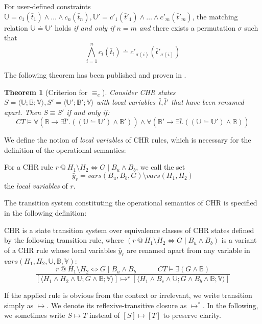 \documentclass[acmtocl]{acmtrans2m}
\newtheorem{theorem}{Theorem}[section]
\newcommand{\de}{\dot=}
\newcommand\state[1]{\langle #1 \rangle}
\newcommand{\B}{\ensuremath{\mathbb{B}}}
\newcommand{\U}{\ensuremath{\mathbb{U}}}
\newcommand{\V}{\ensuremath{\mathbb{V}}}
\newcommand{\bt}{\bar{t}}
\renewcommand{\bt}{\bar{t}}
\newcommand{\by}{\bar{y}}
\newcommand{\bl}{\bar{l}}
\newcommand{\oesq}{\ensuremath{\omega_{e}}}
\begin{document}
\begin{definition}
For user-defined constraints $\U=c_1(\bt_1)\wedge \ldots \wedge c_n(\bt_n),
\U'=c'_1(\bt'_1)\wedge \ldots \wedge c'_m(\bt'_m)$, the matching
relation $\U\doteq\U'$ holds \emph{if and only if} $n=m$ \emph{and} there exists a permutation $\sigma$
such that
\[
\bigwedge_{i=1}^n c_i(\bt_i) \doteq c'_{\sigma(i)}(\bt'_{\sigma(i)})
\]
\end{definition}

The following theorem has been published and proven in
\cite{Raiser2009a}.

\begin{theorem}[Criterion for $\equiv_e$]\label{thm:sq_crit}
\label{thm:criterion}
Consider CHR states $S = \state{\U;\B;\V}, S' = \state{\U';\B';\V}$ with local variables~$\bl,\bl'$ that have been renamed apart. Then $S\equiv S'$
\emph{if and only if}:
\[
CT\models \forall (\B \rightarrow \exists \bl'.((\U \de \U') \wedge
\B')) \wedge \forall (\B' \rightarrow \exists \bl.((\U \de \U') \land \B))
\]
\end{theorem}

We define the notion of \emph{local variables} of CHR rules, which is necessary
for the definition of the operational semantics:

\begin{definition}
For a CHR rule $r\ @\ H_1\setminus H_2\Leftrightarrow G \mid B_u\wedge B_b$, we
call the set
\[
\by_r = vars(B_u, B_b, G)\setminus vars(H_1, H_2)
\]
the \emph{local variables} of $r$.
\end{definition}


The transition system constituting the operational semantics of CHR is specified in the following
definition:

\begin{definition}[Transition System of $\oesq$]
\label{def:chr-op-sem}

CHR is a state transition system over equivalence classes of CHR states defined
by the following transition rule, where $(r\ @\ H_1 \setminus H_2 \Leftrightarrow
G\mid B_u \wedge B_b)$ is a variant of a CHR rule whose local variables $\by_r$
are renamed apart from any variable in $vars(H_1,H_2,\U,\B,\V)$:
\medskip
\[
\frac{
r\ @\ H_1 \setminus H_2 \Leftrightarrow G\mid B_u \wedge B_b
\quad\quad\quad
CT\models \exists(G\wedge\B)
}{
[\state{H_1 \wedge H_2 \wedge \U;G\wedge\B;\V}]
\mapsto^r
[\state{H_1 \wedge B_c \wedge \U;G\wedge B_b\wedge\B;\V}]
}
\]

\medskip
If the applied rule is obvious from the context or irrelevant, we write
transition simply as $\mapsto$. We denote its reflexive-transitive closure as
$\mapsto^{*}$. In the following, we sometimes write $S \mapsto T$ instead of
$[S] \mapsto [T]$ to preserve clarity.
\end{definition}
\end{document}
